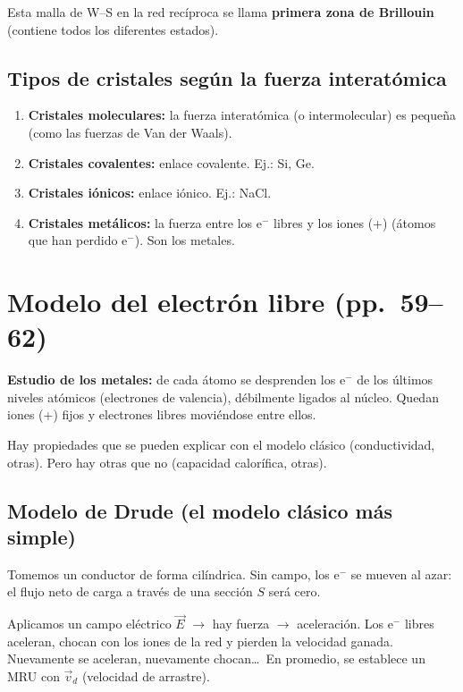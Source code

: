 \documentclass[11pt,a4paper]{article}
\newcommand{\pags}[1]{{\normalfont\small\color{gris}(pp.~#1)}}
\begin{document}
Esta malla de W--S en la red recíproca se llama \textbf{primera zona de Brillouin} (contiene todos los diferentes estados).

\subsection{Tipos de cristales según la fuerza interatómica}
\begin{enumerate}
  \item \textbf{Cristales moleculares:} la fuerza interatómica (o intermolecular) es pequeña (como las fuerzas de Van der Waals).
  \item \textbf{Cristales covalentes:} enlace covalente. Ej.: Si, Ge.
  \item \textbf{Cristales iónicos:} enlace iónico. Ej.: NaCl.
  \item \textbf{Cristales metálicos:} la fuerza entre los e$^-$ libres y los iones (+) (átomos que han perdido e$^-$). Son los metales.
\end{enumerate}
\section{Modelo del electrón libre \pags{59--62}}

\textbf{Estudio de los metales:} de cada átomo se desprenden los e$^-$ de los últimos niveles atómicos (electrones de valencia),
débilmente ligados al núcleo. Quedan iones (+) fijos y electrones libres moviéndose entre ellos.

Hay propiedades que se pueden explicar con el modelo clásico (conductividad, otras). Pero hay otras que no (capacidad
calorífica, otras).

\subsection{Modelo de Drude (el modelo clásico más simple)}
Tomemos un conductor de forma cilíndrica. Sin campo, los e$^-$ se mueven al azar: el flujo neto de carga a través de una
sección $S$ será cero.

Aplicamos un campo eléctrico $\vec E$ $\rightarrow$ hay fuerza $\rightarrow$ aceleración. Los e$^-$ libres aceleran, chocan con los iones
de la red y pierden la velocidad ganada. Nuevamente se aceleran, nuevamente chocan\ldots\ En promedio, se establece un MRU
con $\vec v_d$ (velocidad de arrastre).
\end{document}
